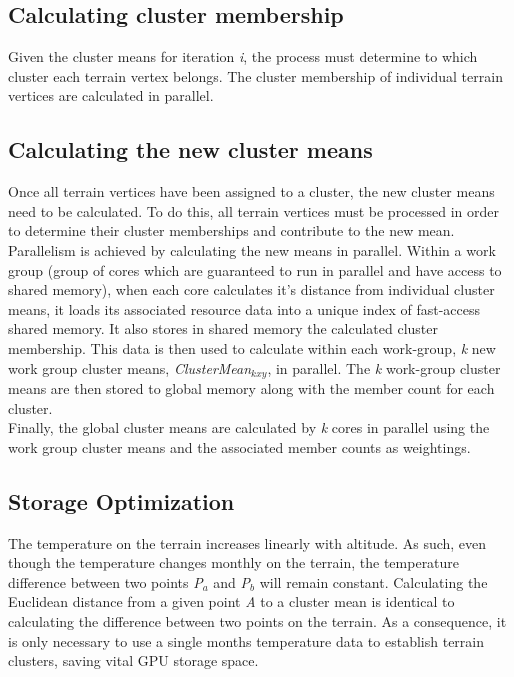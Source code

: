 \subsection{Calculating cluster membership}

Given the cluster means for iteration \textit{i}, the process must determine to which cluster each terrain vertex belongs. The cluster membership of individual terrain vertices are calculated in parallel.

\subsection{Calculating the new cluster means}

Once all terrain vertices have been assigned to a cluster, the new cluster means need to be calculated. To do this, all terrain vertices must be processed in order to determine their cluster memberships and contribute to the new mean.\\

Parallelism is achieved by calculating the new means in parallel. Within a work group (group of cores which are guaranteed to run in parallel and have access to shared memory), when each core calculates it's distance from individual cluster means, it loads its associated resource data into a unique index of fast-access shared memory. It also stores in shared memory the calculated cluster membership. This data is then used to calculate within each work-group, \textit{k} new work group cluster means, \textit{ClusterMean$_{kxy}$}, in parallel. The \textit{k} work-group cluster means are then stored to global memory along with the member count for each cluster.\\

Finally, the global cluster means are calculated by \textit{k} cores in parallel using the work group cluster means and the associated member counts as weightings.\\

\subsection{Storage Optimization}

The temperature on the terrain increases linearly with altitude. As such, even though the temperature changes monthly on the terrain, the temperature difference between two points \textit{P$_{a}$} and \textit{P$_{b}$} will remain constant. Calculating the Euclidean distance from a given point \textit{A} to a cluster mean is identical to calculating the difference between two points on the terrain. As a consequence, it is only necessary to use a single months temperature data to establish terrain clusters, saving vital GPU storage space.

